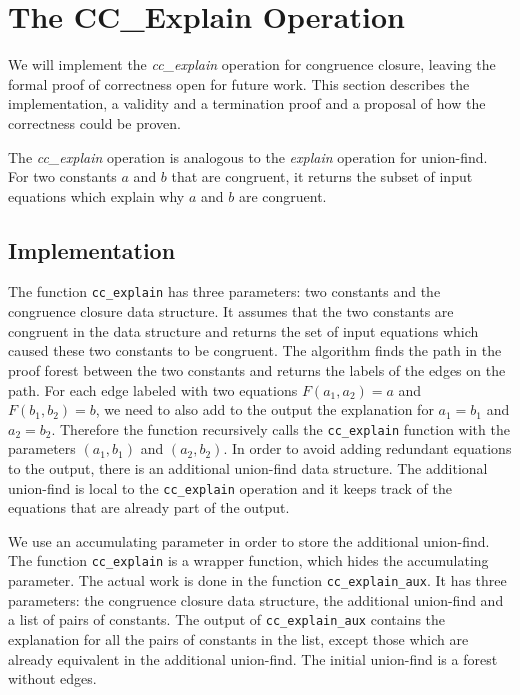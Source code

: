 \chapter{The CC\_Explain Operation}\label{chapter:cc-explain}


We will implement the \emph{cc\_explain} operation for congruence closure, leaving the formal proof of correctness open for future work. This section describes the implementation, a validity and a termination proof and a proposal of how the correctness could be proven.

The \emph{cc\_explain} operation is analogous to the \emph{explain} operation for union-find. For two constants $a$ and $b$ that are congruent, it returns the subset of input equations which explain why $a$ and $b$ are congruent.

\section{Implementation}

The function \lstinline{cc_explain} has three parameters: two constants and the congruence closure data structure.
It assumes that the two constants are congruent in the data structure and returns the set of input equations which caused these two constants to be congruent. The algorithm finds the path in the proof forest between the two constants and returns the labels of the edges on the path. For each edge labeled with two equations $F(a_1, a_2) = a$ and $F(b_1, b_2) = b$, we need to also add to the output the explanation for $a_1 = b_1$ and $a_2 = b_2$. Therefore the function recursively calls the \lstinline{cc_explain} function with the parameters $(a_1, b_1)$ and $(a_2, b_2)$. In order to avoid adding redundant equations to the output, there is an additional union-find data structure. The additional union-find is local to the \lstinline{cc_explain} operation and it keeps track of the equations that are already part of the output.

We use an accumulating parameter in order to store the additional union-find. The function \lstinline|cc_explain| is a wrapper function, which hides the accumulating parameter. The actual work is done in the function \lstinline|cc_explain_aux|.
It has three parameters: the congruence closure data structure, the additional union-find and a list of pairs of constants. The output of \lstinline{cc_explain_aux} contains the explanation for all the pairs of constants in the list, except those which are already equivalent in the additional union-find. The initial union-find is a forest without edges.

